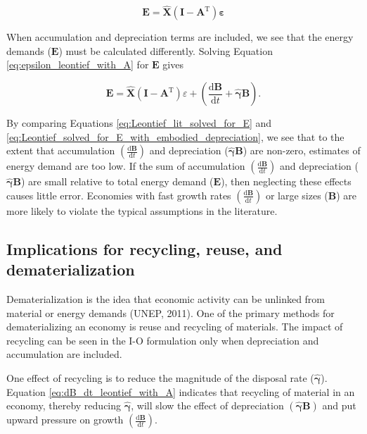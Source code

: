\documentclass[authoryear,preprint,review,12pt]{elsarticle}
\let\oldhat\hat
\renewcommand{\vec}[1]{\mathbf{#1}}
\renewcommand{\hat}[1]{\oldhat{\mathbf{#1}}}
\begin{document}
\begin{equation} \label{eq:Leontief_lit_solved_for_E}
	\vec{E} = \hat{\vec{X}}(\vec{I} - \vec{A}^{\mathrm{T}})\vec{\varepsilon}
\end{equation}

When accumulation and depreciation terms are included, we see that the energy demands ($\vec{E}$) must be calculated differently. Solving Equation \ref{eq:epsilon_leontief_with_A} for $\vec{E}$ gives 

\begin{equation} \label{eq:Leontief_solved_for_E_with_embodied_depreciation}
	\vec{E} = \hat{\vec{X}}(\vec{I} - \vec{A}^{\mathrm{T}})\varepsilon + \left(\frac{\mathrm{d}\vec{B}}{\mathrm{d}t} + \hat{\gamma}\vec{B}\right).
\end{equation}

\noindent By comparing Equations \ref{eq:Leontief_lit_solved_for_E} and \ref{eq:Leontief_solved_for_E_with_embodied_depreciation}, we see that to the extent that accumulation $\left(\frac{\mathrm{d}\vec{B}}{\mathrm{d}t}\right)$ and depreciation ($\hat{\vec{\gamma}}\vec{B}$) are non-zero, estimates of energy demand are too low. If the sum of accumulation $\left(\frac{\mathrm{d}\vec{B}}{\mathrm{d}t}\right)$ and depreciation ($\hat{\vec{\gamma}}\vec{B}$) are small relative to total energy demand ($\vec{E}$), then neglecting these effects causes little error. Economies with fast growth rates $\left(\frac{\mathrm{d}\vec{B}}{\mathrm{d}t}\right)$ or large sizes ($\vec{B}$) are more likely to violate the typical assumptions in the literature.


\subsection{Implications for recycling, reuse, and dematerialization}

Dematerialization is the idea that economic activity can be unlinked from material or energy demands (UNEP, 2011). One of the primary methods for dematerializing an economy is reuse and recycling of materials. The impact of recycling can be seen in the I-O formulation only when depreciation and accumulation are included. 

One effect of recycling is to reduce the magnitude of the disposal rate ($\hat{\vec{\gamma}}$). Equation \ref{eq:dB_dt_leontief_with_A} indicates that recycling of material in an economy, thereby reducing $\hat{\vec{\gamma}}$, will slow the effect of depreciation $\left(\hat{\vec{\gamma}}\vec{B}\right)$ and put upward pressure on growth $\left(\frac{\mathrm{d}\vec{B}}{\mathrm{d}t}\right)$. 
\end{document}
